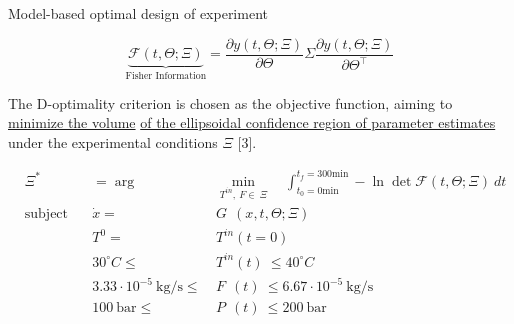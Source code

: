 \documentclass[a0,portrait]{a0poster}
\begin{document}
\begin{multicols}{2}
\begin{tcolorbox}[width=\linewidth, boxrule=0mm, sharp corners=all, colback=white]
\end{tcolorbox}

\begin{tcolorbox}[width=\linewidth, boxrule=0mm, sharp corners=all, colback=white]
	{\LARGE Model-based optimal design of experiment\\}


\begin{equation*}
	\underbrace{\mathcal{F}(t,\Theta; \Xi)}_{\text{Fisher Information}} = \frac{\partial y(t, \Theta; \Xi)}{\partial \Theta} \Sigma \frac{\partial y(t, \Theta; \Xi)}{\partial \Theta^\top}
\end{equation*}

The D-optimality criterion is chosen as the objective function, aiming to \underline{minimize the volume} \underline{of the ellipsoidal confidence region of parameter estimates} under the experimental conditions $\Xi$ [3].

\begin{equation*}
	\begin{aligned} 
		&\Xi^* &= \arg &\min_{ T^{in},~F\in~\Xi}\quad\int_{t_0 = 0 \text{min}}^{t_f=300 \text{min}} - \ln \det \mathcal{F}(t,\Theta; \Xi)~dt  \\
		&\text{subject to}
		& \dot{x} = ~&G~~(x,t,\Theta;\Xi) \\
		&& T^{0} = ~&T^{in}(t=0) \\
		&& 30^\circ C \leq ~&T^{in}(t) ~ \leq 40^\circ C \\
		&& 3.33 \cdot 10^{-5}~\text{kg/s} \leq ~&F~~(t)~ \leq 6.67 \cdot 10^{-5}~\text{kg/s}\\
		&& 100~\text{bar} \leq ~&P~~(t)~ \leq 200~\text{bar} \\
	\end{aligned}
\end{equation*}


\end{tcolorbox}
\end{multicols}
\end{document}
